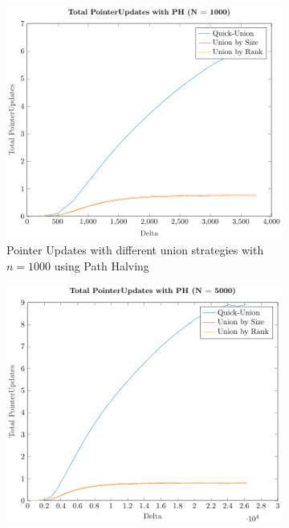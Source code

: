 \begin{figure}[ht]
    \begin{subfigure}{0.32\textwidth}
        \centering
        \includegraphics[width=\textwidth]{../images/plotPHFull1000_PointerUpdates.pdf}
        \caption{Pointer Updates with different union strategies with $n = 1000$ using Path Halving}
    \end{subfigure}%
    \hfill
    \begin{subfigure}{0.32\textwidth}
        \centering
        \includegraphics[width=\textwidth]{../images/plotPHFull5000_PointerUpdates.pdf}

\end{subfigure}
\end{figure}
